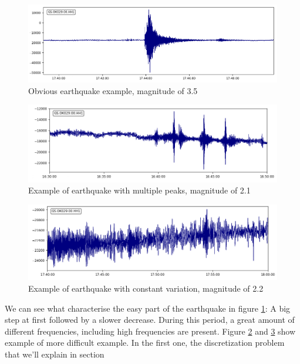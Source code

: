 \documentclass[10pt,conference,compsocconf]{IEEEtran}
\begin{document}
\begin{figure}[h]
  \centering
	\includegraphics[width=\columnwidth]{fat-earthquake-example.png}
  \caption{Obvious earthquake example, magnitude of 3.5}
	\label{fig:obvious}
\end{figure}

\begin{figure}[h]
  \centering
	\includegraphics[width=\columnwidth]{multiple-peaks-example.png}
  \caption{Example of earthquake with multiple peaks, magnitude of 2.1}
	\label{fig:multiplepeaks}
\end{figure}
\begin{figure}[h]
  \centering
	\includegraphics[width=\columnwidth]{constant-variation-example.png}
  \caption{Example of earthquake with constant variation, magnitude of 2.2}
	\label{fig:constanteq}
\end{figure}

We can see what characterise the easy part of the earthquake in figure \ref{fig:obvious}: A big step at first followed by a slower decrease. During this period, a great amount of different frequencies, including high frequencies are present. Figure \ref{fig:multiplepeaks} and \ref{fig:constanteq} show example of more difficult example. In the first one, the discretization problem that we'll explain in section
\end{document}

